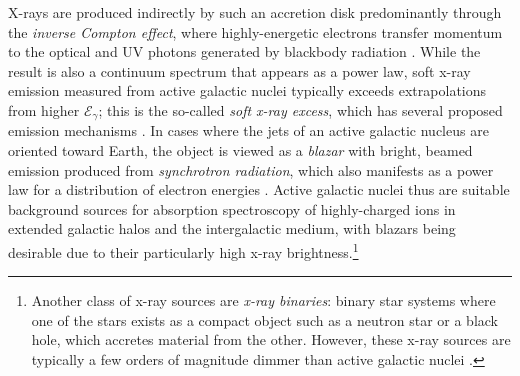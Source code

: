 X-rays are produced indirectly by such an accretion disk predominantly through the \emph{inverse Compton effect}, where highly-energetic electrons transfer momentum to the optical and UV photons generated by blackbody radiation \cite{Haardt91,Schneider06,Netzer13}. 
While the result is also a continuum spectrum that appears as a power law, soft x-ray emission measured from active galactic nuclei typically exceeds extrapolations from higher $\mathcal{E}_{\gamma}$; this is the so-called \emph{soft x-ray excess}, which has several proposed emission mechanisms \cite{Walter93,Schneider06,Crummy06,Gliozzi20}. %
In cases where the jets of an active galactic nucleus are oriented toward Earth, the object is viewed as a \emph{blazar} with bright, beamed emission produced from \emph{synchrotron radiation}, which also manifests as a power law for a distribution of electron energies \cite{Rybicki86,Schneider06,Netzer13,Pal20}. %
Active galactic nuclei thus are suitable background sources for absorption spectroscopy of highly-charged ions in extended galactic halos and the intergalactic medium, with blazars being desirable due to their particularly high x-ray brightness.\footnote{Another class of x-ray sources are \emph{x-ray binaries}: binary star systems where one of the stars exists as a compact object such as a neutron star or a black hole, which accretes material from the other. However, these x-ray sources are typically a few orders of magnitude dimmer than active galactic nuclei \cite{Schneider06}.}  %

